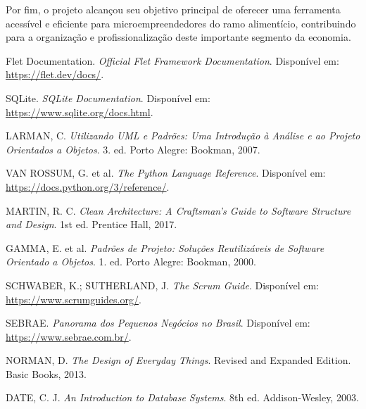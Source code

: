 \documentclass[conference]{IEEEtran}
\begin{document}
Por fim, o projeto alcançou seu objetivo principal de oferecer uma ferramenta acessível e eficiente para microempreendedores do ramo alimentício, contribuindo para a organização e profissionalização deste importante segmento da economia.

\begin{thebibliography}{9}

Flet Documentation. 
\textit{Official Flet Framework Documentation}. 
Disponível em: \url{https://flet.dev/docs/}. 

SQLite. 
\textit{SQLite Documentation}. 
Disponível em: \url{https://www.sqlite.org/docs.html}. 

LARMAN, C. 
\textit{Utilizando UML e Padrões: Uma Introdução à Análise e ao Projeto Orientados a Objetos}. 
3. ed. Porto Alegre: Bookman, 2007.

VAN ROSSUM, G. et al. 
\textit{The Python Language Reference}. 
Disponível em: \url{https://docs.python.org/3/reference/}. 

MARTIN, R. C. 
\textit{Clean Architecture: A Craftsman's Guide to Software Structure and Design}. 
1st ed. Prentice Hall, 2017.

GAMMA, E. et al. 
\textit{Padrões de Projeto: Soluções Reutilizáveis de Software Orientado a Objetos}. 
1. ed. Porto Alegre: Bookman, 2000.

SCHWABER, K.; SUTHERLAND, J. 
\textit{The Scrum Guide}. 
Disponível em: \url{https://www.scrumguides.org/}. 

SEBRAE. 
\textit{Panorama dos Pequenos Negócios no Brasil}. 
Disponível em: \url{https://www.sebrae.com.br/}. 

NORMAN, D. 
\textit{The Design of Everyday Things}. 
Revised and Expanded Edition. Basic Books, 2013.

DATE, C. J. 
\textit{An Introduction to Database Systems}. 
8th ed. Addison-Wesley, 2003.

\end{thebibliography}
\end{document}
